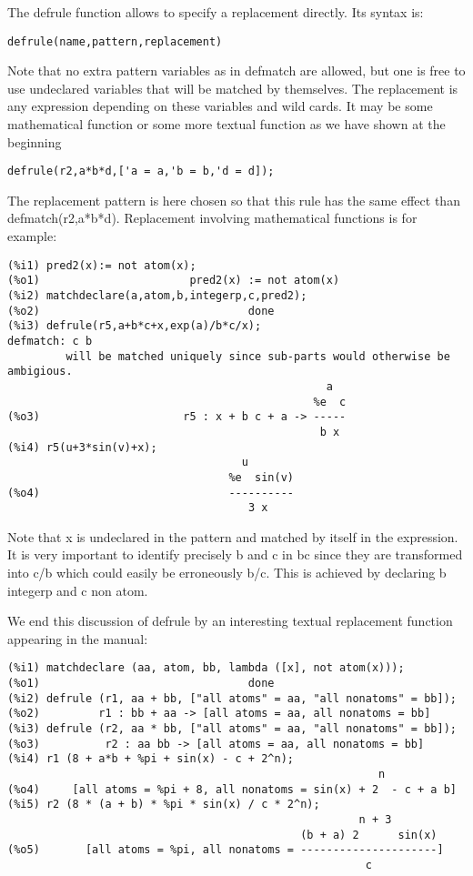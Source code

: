 \documentclass[a4paper,11pt]{article}
\begin{document}
The defrule function allows to specify a replacement directly. Its syntax is:

\begin{verbatim}
defrule(name,pattern,replacement)
\end{verbatim}

Note that no extra pattern variables as in defmatch are allowed, but
one is free to use undeclared variables that will be matched by
themselves. The replacement is any expression depending on these
variables and wild cards. It may be some mathematical function or some
more textual function as we have shown at the beginning

\begin{verbatim}
defrule(r2,a*b*d,['a = a,'b = b,'d = d]);
\end{verbatim}

The replacement pattern is here chosen so that this rule has the same
effect than defmatch(r2,a*b*d). Replacement involving mathematical
functions is for example:
\begin{verbatim}
(%i1) pred2(x):= not atom(x);
(%o1)                       pred2(x) := not atom(x)
(%i2) matchdeclare(a,atom,b,integerp,c,pred2);
(%o2)                                done
(%i3) defrule(r5,a+b*c+x,exp(a)/b*c/x);
defmatch: c b
         will be matched uniquely since sub-parts would otherwise be ambigious.
                                                 a
                                               %e  c
(%o3)                      r5 : x + b c + a -> -----
                                                b x
(%i4) r5(u+3*sin(v)+x);
                                    u
                                  %e  sin(v)
(%o4)                             ----------
                                     3 x
\end{verbatim}
Note that x is undeclared in the pattern and matched by itself in the expression.
It is very important to identify precisely b and c in bc since they are transformed
into c/b which could easily be erroneously b/c. This is achieved by declaring b
integerp and c non atom. 



We end this discussion of defrule by an interesting textual replacement function
appearing in the manual:

\begin{verbatim}
(%i1) matchdeclare (aa, atom, bb, lambda ([x], not atom(x)));
(%o1)                                done
(%i2) defrule (r1, aa + bb, ["all atoms" = aa, "all nonatoms" = bb]);
(%o2)         r1 : bb + aa -> [all atoms = aa, all nonatoms = bb]
(%i3) defrule (r2, aa * bb, ["all atoms" = aa, "all nonatoms" = bb]);
(%o3)          r2 : aa bb -> [all atoms = aa, all nonatoms = bb]
(%i4) r1 (8 + a*b + %pi + sin(x) - c + 2^n);
                                                         n
(%o4)     [all atoms = %pi + 8, all nonatoms = sin(x) + 2  - c + a b]
(%i5) r2 (8 * (a + b) * %pi * sin(x) / c * 2^n);
                                                      n + 3
                                             (b + a) 2      sin(x)
(%o5)       [all atoms = %pi, all nonatoms = ---------------------]
                                                       c
\end{verbatim}
\end{document}
